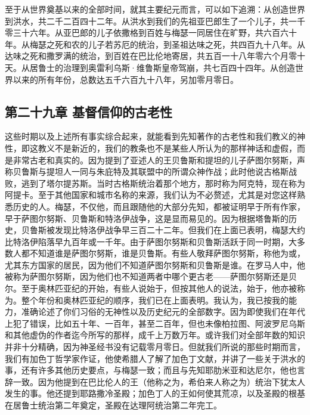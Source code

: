 至于从世界奠基以来的全部时间，就其主要纪元而言，可以如下追溯：从创造世界到洪水，共二千二百四十二年。从洪水到我们的先祖亚巴郎生了一个儿子，共一千零三十六年。从亚巴郎的儿子依撒格到百姓与梅瑟一同居住在旷野，共六百六十年。从梅瑟之死和农的儿子若苏厄的统治，到圣祖达味之死，共四百九十八年。从达味之死和撒罗满的统治，到百姓在巴比伦地寄居，共五百一十八年零六个月零十天。从居鲁士的治理到奥雷利乌斯·维鲁斯皇帝驾崩，共七百四十四年。从创造世界以来的所有年份，总数达五千六百九十八年，另加零月零日。\par


\subsection{第二十九章 基督信仰的古老性}

这些时期以及上述所有事实综合起来，就能看到先知著作的古老性和我们教义的神性，即这教义不是新近的，我们的教条也不是某些人所认为的那样神话和虚假，而是非常古老和真实的。因为提到了亚述人的王贝鲁斯和提坦的儿子萨图尔努斯，声称贝鲁斯与提坦人一同与朱庇特及其联盟中的所谓众神作战；此时他说古格斯战败，逃到了塔尔提苏斯。当时古格斯统治着那个地方，那时称为阿克特，现在称为阿提卡。至于其他国家和城市名称的来源，我们认为不必赘述，尤其是对您这样熟悉历史的人。梅瑟，不仅他，而且跟随他的大部分先知，都被证明早于所有作家，早于萨图尔努斯、贝鲁斯和特洛伊战争，这是显而易见的。因为根据塔鲁斯的历史，贝鲁斯被发现比特洛伊战争早三百二十二年。但我们在上面已表明，梅瑟大约比特洛伊陷落早九百年或一千年。由于萨图尔努斯和贝鲁斯活跃于同一时期，大多数人都不知道谁是萨图尔努斯，谁是贝鲁斯。有些人敬拜萨图尔努斯，称他为或，尤其东方国家的居民，因为他们不知道萨图尔努斯和贝鲁斯是谁。在罗马人中，他被称为萨图尔努斯，因为他们也不知道两者中哪个更古老——萨图尔努斯还是贝尔。至于奥林匹亚纪的开始，有些人说始于，但按其他人的说法，始于，他亦被称为。整个年份和奥林匹亚纪的顺序，我们已在上面表明。我认为，我已按我的能力，准确论述了你们习俗的无神性以及历史纪元的全部数字。因为即使我们在年代上犯了错误，比如五十年、一百年，甚至二百年，但也未像柏拉图、阿波罗尼乌斯和其他虚伪的作者迄今所写的那样，成千上万数万年。或许我们对全部年数的知识并非十分精确，因为神圣经书没有记载零月零日。但就我们所说的那些时期而言，我们有加色丁哲学家作证，他使希腊人了解了加色丁文献，并讲了一些关于洪水的事，还有许多其他历史要点，与梅瑟一致；而且与先知耶肋米亚和达尼尔，他也言辞一致。因为他提到在巴比伦人的王（他称之为，希伯来人称之为）统治下犹太人发生的事。他还提到耶路撒冷圣殿；加色丁人的王如何使其荒凉，以及圣殿的根基在居鲁士统治第二年奠定，圣殿在达理阿统治第二年完工。\par


